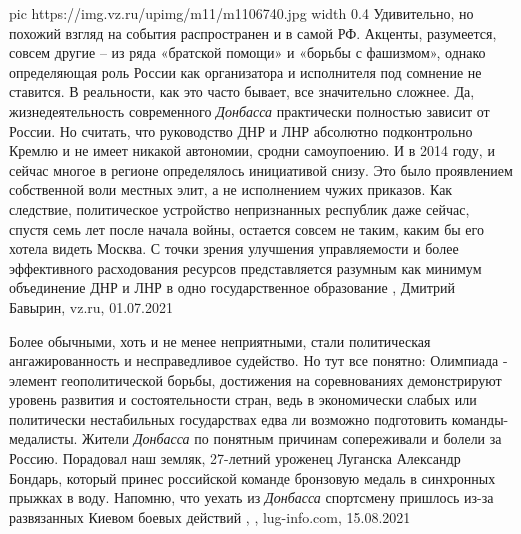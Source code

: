\ifcmt
  pic https://img.vz.ru/upimg/m11/m1106740.jpg
  width 0.4
\fi
Удивительно, но похожий взгляд на события распространен и в самой РФ. Акценты,
разумеется, совсем другие – из ряда «братской помощи» и «борьбы с фашизмом»,
однако определяющая роль России как организатора и исполнителя под сомнение не
ставится.  В реальности, как это часто бывает, все значительно сложнее. Да,
жизнедеятельность современного \emph{Донбасса} практически полностью зависит от
России. Но считать, что руководство ДНР и ЛНР абсолютно подконтрольно Кремлю и
не имеет никакой автономии, сродни самоупоению.  И в 2014 году, и сейчас многое
в регионе определялось инициативой снизу. Это было проявлением собственной воли
местных элит, а не исполнением чужих приказов.  Как следствие, политическое
устройство непризнанных республик даже сейчас, спустя семь лет после начала
войны, остается совсем не таким, каким бы его хотела видеть Москва. С точки
зрения улучшения управляемости и более эффективного расходования ресурсов
представляется разумным как минимум объединение ДНР и ЛНР в одно
государственное образование
, Дмитрий Бавырин, vz.ru, 01.07.2021

Более обычными, хоть и не менее неприятными, стали политическая
ангажированность и несправедливое судейство. Но тут все понятно: Олимпиада -
элемент геополитической борьбы, достижения на соревнованиях демонстрируют
уровень развития и состоятельности стран, ведь в экономически слабых или
политически нестабильных государствах едва ли возможно подготовить
команды-медалисты.  Жители \emph{Донбасса} по понятным причинам сопереживали и болели
за Россию. Порадовал наш земляк, 27-летний уроженец Луганска Александр Бондарь,
который принес российской команде бронзовую медаль в синхронных прыжках в воду.
Напомню, что уехать из \emph{Донбасса} спортсмену пришлось из-за развязанных Киевом
боевых действий
, 
, lug-info.com, 15.08.2021
